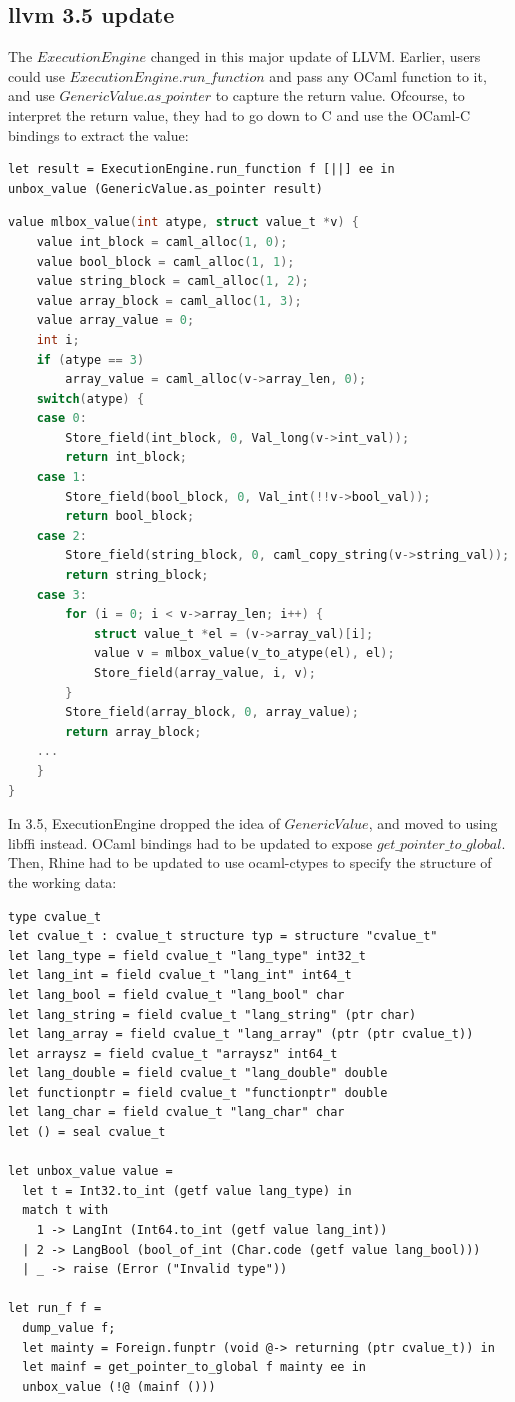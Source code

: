 \documentclass{article}
\begin{document}
\subsection{llvm 3.5 update}
The $ExecutionEngine$ changed in this major update of LLVM. Earlier,
users could use $ExecutionEngine.run\_function$ and pass any OCaml
function to it, and use $GenericValue.as\_pointer$ to capture the
return value. Ofcourse, to interpret the return value, they had to go
down to C and use the OCaml-C bindings to extract the value:
\begin{lstlisting}[language=caml]
let result = ExecutionEngine.run_function f [||] ee in
unbox_value (GenericValue.as_pointer result)
\end{lstlisting}
\begin{lstlisting}[language=c]
value mlbox_value(int atype, struct value_t *v) {
	value int_block = caml_alloc(1, 0);
	value bool_block = caml_alloc(1, 1);
	value string_block = caml_alloc(1, 2);
	value array_block = caml_alloc(1, 3);
	value array_value = 0;
	int i;
	if (atype == 3)
		array_value = caml_alloc(v->array_len, 0);
	switch(atype) {
	case 0:
		Store_field(int_block, 0, Val_long(v->int_val));
		return int_block;
	case 1:
		Store_field(bool_block, 0, Val_int(!!v->bool_val));
		return bool_block;
	case 2:
		Store_field(string_block, 0, caml_copy_string(v->string_val));
		return string_block;
	case 3:
		for (i = 0; i < v->array_len; i++) {
			struct value_t *el = (v->array_val)[i];
			value v = mlbox_value(v_to_atype(el), el);
			Store_field(array_value, i, v);
		}
		Store_field(array_block, 0, array_value);
		return array_block;
	...
	}
}
\end{lstlisting}
In 3.5, ExecutionEngine dropped the idea of $GenericValue$, and moved
to using libffi instead. OCaml bindings had to be updated to expose
$get\_pointer\_to\_global$.\\

Then, Rhine had to be updated to use ocaml-ctypes to specify the
structure of the working data:
\begin{lstlisting}[language=caml]
type cvalue_t
let cvalue_t : cvalue_t structure typ = structure "cvalue_t"
let lang_type = field cvalue_t "lang_type" int32_t
let lang_int = field cvalue_t "lang_int" int64_t
let lang_bool = field cvalue_t "lang_bool" char
let lang_string = field cvalue_t "lang_string" (ptr char)
let lang_array = field cvalue_t "lang_array" (ptr (ptr cvalue_t))
let arraysz = field cvalue_t "arraysz" int64_t
let lang_double = field cvalue_t "lang_double" double
let functionptr = field cvalue_t "functionptr" double
let lang_char = field cvalue_t "lang_char" char
let () = seal cvalue_t

let unbox_value value =
  let t = Int32.to_int (getf value lang_type) in
  match t with
    1 -> LangInt (Int64.to_int (getf value lang_int))
  | 2 -> LangBool (bool_of_int (Char.code (getf value lang_bool)))
  | _ -> raise (Error ("Invalid type"))

let run_f f =
  dump_value f;
  let mainty = Foreign.funptr (void @-> returning (ptr cvalue_t)) in
  let mainf = get_pointer_to_global f mainty ee in
  unbox_value (!@ (mainf ()))
\end{lstlisting}
\end{document}
